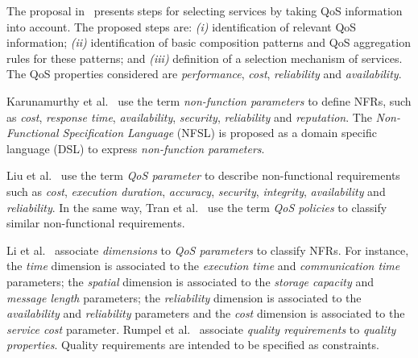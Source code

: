 \documentclass[12pt,twoside]{article}
\theoremstyle{plain}
\theoremstyle{plain}
\begin{document}
\begin{multicols}{2}
The proposal in~\cite{ThissenW06} presents steps for  selecting services
by taking QoS information into account. The proposed steps are:
\textit{(i)} identification of relevant QoS information;
\textit{(ii)} identification of basic composition patterns and
QoS aggregation rules for these patterns; and
\textit{(iii)} definition of a selection mechanism of services.
The QoS properties considered are \textit{performance}, \textit{cost}, \textit{reliability} and
\textit{availability}.

Karunamurthy et al.~\cite{Karunamurthy2012787} use the term \textit{non-function parameters} to define NFRs, such as \textit{cost}, \textit{response time}, \textit{availability}, \textit{security}, \textit{reliability} and \textit{reputation}.
The \textit{Non-Func\-tion\-al Specification Language} (NFSL) is proposed as a domain specific language (DSL) to express \textit{non-function parameters}.

Liu et al.~\cite{Liu20121080} use the term \textit{QoS parameter} to describe non-functional requirements such as \textit{cost}, \textit{execution duration}, \textit{accuracy}, \textit{security}, \textit{integrity}, \textit{availability} and \textit{reliability}.
In the same way, Tran et al.~\cite{Tran2012531} use the term \textit{QoS policies} to classify similar non-functional requirements.

Li et al.~\cite{Li2013} associate \textit{dimensions} to  \textit{QoS parameters} to classify NFRs.
For instance, the \textit{time} dimension is associated to the \textit{execution time} and \textit{communication time} parameters; the \textit{spatial} dimension is associated to the \textit{storage capacity} and \textit{message length} parameters; the \textit{reliability} dimension is associated to the \textit{availability} and \textit{reliability} parameters and the \textit{cost} dimension is associated to the \textit{service cost} parameter.
Rumpel et al.~\cite{Rumpel2012}  associate \textit{quality requirements} to  \textit{quality properties}. Quality requirements are intended to be specified as constraints.




\end{multicols}
\end{document}
